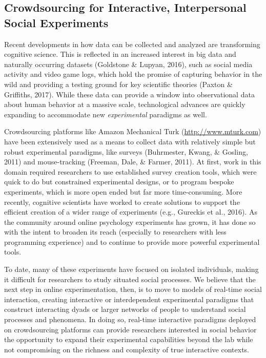 \documentclass[10pt, letterpaper]{article}
\begin{document}
\subsection{Crowdsourcing for Interactive, Interpersonal Social
Experiments}\label{crowdsourcing-for-interactive-interpersonal-social-experiments}

Recent developments in how data can be collected and analyzed are
transforming cognitive science. This is reflected in an increased
interest in big data and naturally occurring datasets (Goldstone \&
Lupyan, 2016), such as social media activity and video game logs, which
hold the promise of capturing behavior in the wild and providing a
testing ground for key scientific theories (Paxton \& Griffiths, 2017).
While these data can provide a window into observational data about
human behavior at a massive scale, technological advances are quickly
expanding to accommodate new \emph{experimental} paradigms as well.

Crowdsourcing platforms like Amazon Mechanical Turk
(\url{http://www.mturk.com}) have been extensively used as a means to
collect data with relatively simple but robust experimental paradigms,
like surveys (Buhrmester, Kwang, \& Gosling, 2011) and mouse-tracking
(Freeman, Dale, \& Farmer, 2011). At first, work in this domain required
researchers to use established survey creation tools, which were quick
to do but constrained experimental designs, or to program bespoke
experiments, which is more open ended but far more time-consuming. More
recently, cognitive scientists have worked to create solutions to
support the efficient creation of a wider range of experiments (e.g.,
Gureckis et al., 2016). As the community around online psychology
experiments has grown, it has done so with the intent to broaden its
reach (especially to researchers with less programming experience) and
to continue to provide more powerful experimental tools.

To date, many of these experiments have focused on isolated individuals,
making it difficult for researchers to study situated social processes.
We believe that the next step in online experimentation, then, is to
move to models of real-time social interaction, creating interactive or
interdependent experimental paradigms that construct interacting dyads
or larger networks of people to understand social processes and
phenomena. In doing so, real-time interactive paradigms deployed on
crowdsourcing platforms can provide researchers interested in social
behavior the opportunity to expand their experimental capabilities
beyond the lab while not compromising on the richness and complexity of
true interactive contexts.
\end{document}
